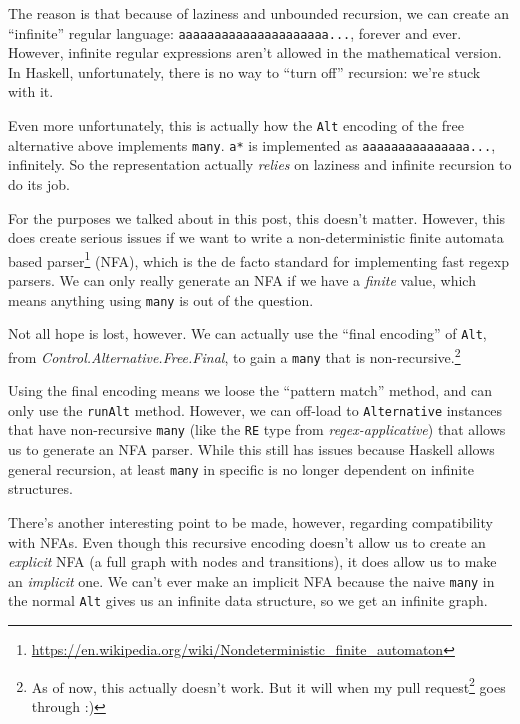 \documentclass[]{article}
\renewcommand{\href}[2]{#2\footnote{\url{#1}}}
\begin{document}
The reason is that because of laziness and unbounded recursion, we can create an
``infinite'' regular language:
\texttt{a\textbar{}aa\textbar{}aaa\textbar{}aaaa\textbar{}aaaaa\textbar{}aaaaaa\textbar{}...},
forever and ever. However, infinite regular expressions aren't allowed in the
mathematical version. In Haskell, unfortunately, there is no way to ``turn off''
recursion: we're stuck with it.

Even more unfortunately, this is actually how the \texttt{Alt} encoding of the
free alternative above implements \texttt{many}. \texttt{a*} is implemented as
\texttt{\textbar{}a\textbar{}aa\textbar{}aaa\textbar{}aaaa\textbar{}aaaaa\textbar{}...},
infinitely. So the representation actually \emph{relies} on laziness and
infinite recursion to do its job.

For the purposes we talked about in this post, this doesn't matter. However,
this does create serious issues if we want to write a
\href{https://en.wikipedia.org/wiki/Nondeterministic_finite_automaton}{non-deterministic
finite automata based parser} (NFA), which is the de facto standard for
implementing fast regexp parsers. We can only really generate an NFA if we have
a \emph{finite} value, which means anything using \texttt{many} is out of the
question.

Not all hope is lost, however. We can actually use the ``final encoding'' of
\texttt{Alt}, from \emph{Control.Alternative.Free.Final}, to gain a
\texttt{many} that is non-recursive.\footnote{As of now, this actually doesn't
  work. But it will when my \href{https://github.com/ekmett/free/pull/188}{pull
  request} goes through :)}

Using the final encoding means we loose the ``pattern match'' method, and can
only use the \texttt{runAlt} method. However, we can off-load to
\texttt{Alternative} instances that have non-recursive \texttt{many} (like the
\texttt{RE} type from \emph{regex-applicative}) that allows us to generate an
NFA parser. While this still has issues because Haskell allows general
recursion, at least \texttt{many} in specific is no longer dependent on infinite
structures.

There's another interesting point to be made, however, regarding compatibility
with NFAs. Even though this recursive encoding doesn't allow us to create an
\emph{explicit} NFA (a full graph with nodes and transitions), it does allow us
to make an \emph{implicit} one. We can't ever make an implicit NFA because the
naive \texttt{many} in the normal \texttt{Alt} gives us an infinite data
structure, so we get an infinite graph.
\end{document}
